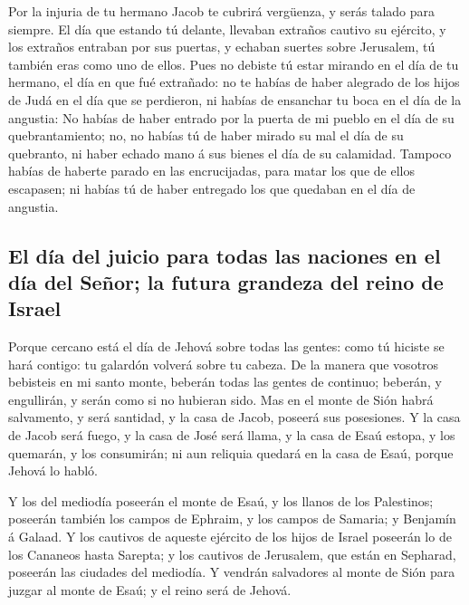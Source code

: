  Por la injuria de tu hermano Jacob te cubrirá vergüenza, y
serás talado para siempre.  El día que estando tú delante,
llevaban extraños cautivo su ejército, y los extraños entraban por sus
puertas, y echaban suertes sobre Jerusalem, tú también eras como uno de
ellos.  Pues no debiste tú estar mirando en el día de tu
hermano, el día en que fué extrañado: no te habías de haber alegrado de
los hijos de Judá en el día que se perdieron, ni habías de ensanchar tu
boca en el día de la angustia:  No habías de haber entrado
por la puerta de mi pueblo en el día de su quebrantamiento; no, no
habías tú de haber mirado su mal el día de su quebranto, ni haber echado
mano á sus bienes el día de su calamidad.  Tampoco habías
de haberte parado en las encrucijadas, para matar los que de ellos
escapasen; ni habías tú de haber entregado los que quedaban en el día de
angustia.

\hypertarget{el-duxeda-del-juicio-para-todas-las-naciones-en-el-duxeda-del-seuxf1or-la-futura-grandeza-del-reino-de-israel}{%
\subsection{El día del juicio para todas las naciones en el día del
Señor; la futura grandeza del reino de
Israel}\label{el-duxeda-del-juicio-para-todas-las-naciones-en-el-duxeda-del-seuxf1or-la-futura-grandeza-del-reino-de-israel}}

 Porque cercano está el día de Jehová sobre todas las
gentes: como tú hiciste se hará contigo: tu galardón volverá sobre tu
cabeza.  De la manera que vosotros bebisteis en mi santo
monte, beberán todas las gentes de continuo; beberán, y engullirán, y
serán como si no hubieran sido.  Mas en el monte de Sión
habrá salvamento, y será santidad, y la casa de Jacob, poseerá sus
posesiones.  Y la casa de Jacob será fuego, y la casa de
José será llama, y la casa de Esaú estopa, y los quemarán, y los
consumirán; ni aun reliquia quedará en la casa de Esaú, porque Jehová lo
habló.

 Y los del mediodía poseerán el monte de Esaú, y los llanos
de los Palestinos; poseerán también los campos de Ephraim, y los campos
de Samaria; y Benjamín á Galaad.  Y los cautivos de aqueste
ejército de los hijos de Israel poseerán lo de los Cananeos hasta
Sarepta; y los cautivos de Jerusalem, que están en Sepharad, poseerán
las ciudades del mediodía.  Y vendrán salvadores al monte
de Sión para juzgar al monte de Esaú; y el reino será de Jehová.
